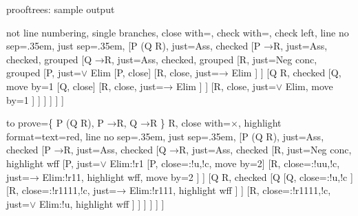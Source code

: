 \documentclass[10pt,british,a4paper,doc2]{ltxdoc}
\newcommand*{\fycheck}{\text{\ding{52}}}
\newcommand*{\fycross}{\text{\ding{56}}}
\newcommand*\pkg[1]{\textsf{#1}}
\newcommand*{\lif}{\ensuremath{\mathbin{\rightarrow}}}
\begin{document}
\begin{coeden}[label=sample, floatplacement={!bp}, grow to left by=3em, grow to right by=3em]{\pkg{prooftrees}: sample output}
  \begin{tableau}
    {
      not line numbering,
      single branches,
      close with={\fycross},
      check with={\fycheck},
      check left,
      line no sep=.35em,
      just sep=.35em,
    }
    [P \lor (Q \lor \lnot R),  just=Ass, checked
      [P \lif \lnot R,  just=Ass, checked, grouped
        [Q \lif \lnot R,  just=Ass, checked, grouped
          [\lnot\lnot R, just={Neg conc}, grouped
            [P,  just={$\lor$ Elim}
              [\lnot P, close]
              [\lnot R,  close, just={$\lif$ Elim}
              ]
            ]
            [Q \lor \lnot R, checked
              [Q, move by=1
                [\lnot Q, close]
                [\lnot R,  close, just={$\lif$ Elim}
                ]
              ]
              [\lnot R, close, just={$\lor$ Elim}, move by=1
              ]
            ]
          ]
        ]
      ]
    ]
  \end{tableau}%
  \hfill\begin{tableau}
    {
      to prove={\{ P \lor (Q \lor \lnot R), P \lif \lnot R, Q \lif \lnot R \} \therefore \lnot R},
      close with={\ensuremath{\times}},
      highlight format={text=red},
      line no sep=.35em,
      just sep=.35em,
    }
    [P \lor (Q \lor \lnot R),  just=Ass, checked
      [P \lif \lnot R,  just=Ass, checked
        [Q \lif \lnot R,  just=Ass, checked
          [\lnot\lnot R, just={Neg conc}, highlight wff
            [P,  just={$\lor$ Elim:!r1}
              [\lnot P, close={:!u,!c}, move by=2]
              [\lnot R,  close={:!uu,!c}, just={$\lif$ Elim:!r11}, highlight wff, move by=2
              ]
            ]
            [Q \lor \lnot R, checked
              [Q
                [\lnot Q, close={:!u,!c}
                ]
                [\lnot R,  close={:!r1111,!c}, just={$\lif$ Elim:!r111}, highlight wff
                ]
              ]
              [\lnot R, close={:!r1111,!c}, just={$\lor$ Elim:!u}, highlight wff
              ]
            ]
          ]
        ]
      ]
    ]
  \end{tableau}


\end{coeden}
\end{document}
